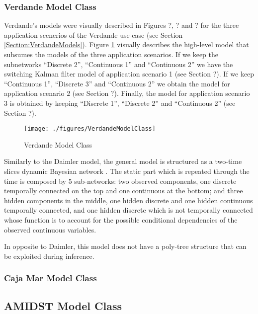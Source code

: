 \subsubsection*{Verdande Model Class}

Verdande's models were visually described in Figures ?, ? and ? for the three application scenerios of the Verdande use-case (see Section \ref{Section:VerdandeModels}).
Figure \ref{Figure:VerdandeModelClass} visually describes the high-level model that subsumes the models
of the three application scenarios. If we keep the subnetworks ``Discrete 2'', ``Continuous 1'' and ``Continuous 2'' we have the switching Kalman filter model of application scenario 1 (see Section ?). If we keep ``Continuous 1'', ``Discrete 3'' and ``Continuous 2'' we obtain the model for application scenario 2 (see Section ?). Finally, the model for application scenario 3 is obtained by keeping ``Discrete 1'', ``Discrete 2'' and ``Continuous 2'' (see Section ?).  

\begin{figure}
\begin{center}
\texttt{[image: ./figures/VerdandeModelClass]}
\caption{\label{Figure:VerdandeModelClass} Verdande Model Class}
\end{center}
\end{figure}

Similarly to the Daimler model, the general model is structured as a two-time slices dynamic Bayesian network \cite{nielsen2009bayesian}. The static part which is repeated through the time is composed by 5 sub-networks: two observed components, one discrete temporally connected on the top and one continuous at the bottom; and three hidden components in the middle, one hidden discrete and one hidden continuous temporally connected, and one hidden discrete which is not temporally connected whose function is to account for the possible conditional dependencies of the observed continuous variables.  

In opposite to Daimler,  this model does not have a poly-tree structure that can be exploited during inference. 

\subsubsection*{Caja Mar Model Class}




\subsection{AMIDST Model Class}




